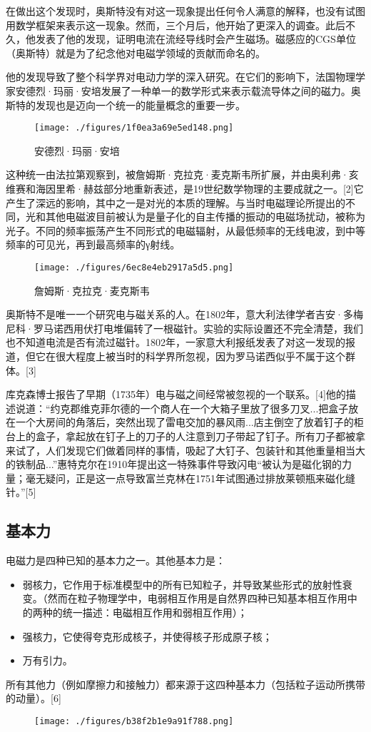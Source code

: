 在做出这个发现时，奥斯特没有对这一现象提出任何令人满意的解释，也没有试图用数学框架来表示这一现象。然而，三个月后，他开始了更深入的调查。此后不久，他发表了他的发现，证明电流在流经导线时会产生磁场。磁感应的CGS单位（奥斯特）就是为了纪念他对电磁学领域的贡献而命名的。

他的发现导致了整个科学界对电动力学的深入研究。在它们的影响下，法国物理学家安德烈·玛丽·安培发展了一种单一的数学形式来表示载流导体之间的磁力。奥斯特的发现也是迈向一个统一的能量概念的重要一步。
\begin{figure}[ht]
\centering
\texttt{[image: ./figures/1f0ea3a69e5ed148.png]}
\caption{安德烈·玛丽·安培} \label{fig_DCXHZY_2}
\end{figure}

这种统一由法拉第观察到，被詹姆斯·克拉克·麦克斯韦所扩展，并由奥利弗·亥维赛和海因里希·赫兹部分地重新表述，是19世纪数学物理的主要成就之一。[2]它产生了深远的影响，其中之一是对光的本质的理解。与当时电磁理论所提出的不同，光和其他电磁波目前被认为是量子化的自主传播的振动的电磁场扰动，被称为光子。不同的频率振荡产生不同形式的电磁辐射，从最低频率的无线电波，到中等频率的可见光，再到最高频率的γ射线。
\begin{figure}[ht]
\centering
\texttt{[image: ./figures/6ec8e4eb2917a5d5.png]}
\caption{詹姆斯·克拉克·麦克斯韦} \label{fig_DCXHZY_3}
\end{figure}
奥斯特不是唯一一个研究电与磁关系的人。在1802年，意大利法律学者吉安·多梅尼科·罗马诺西用伏打电堆偏转了一根磁针。实验的实际设置还不完全清楚，我们也不知道电流是否有流过磁针。1802年，一家意大利报纸发表了对这一发现的报道，但它在很大程度上被当时的科学界所忽视，因为罗马诺西似乎不属于这个群体。[3]

库克森博士报告了早期（1735年）电与磁之间经常被忽视的一个联系。[4]他的描述说道：“约克郡维克菲尔德的一个商人在一个大箱子里放了很多刀叉...把盒子放在一个大房间的角落后，突然出现了雷电交加的暴风雨...店主倒空了放着钉子的柜台上的盒子，拿起放在钉子上的刀子的人注意到刀子带起了钉子。所有刀子都被拿来试了，人们发现它们做着同样的事情，吸起了大钉子、包装针和其他重量相当大的铁制品...”惠特克尔在1910年提出这一特殊事件导致闪电“被认为是磁化钢的力量；毫无疑问，正是这一点导致富兰克林在1751年试图通过排放莱顿瓶来磁化缝针。”[5]
\subsection{基本力}
电磁力是四种已知的基本力之一。其他基本力是：
\begin{itemize}
\item 弱核力，它作用于标准模型中的所有已知粒子，并导致某些形式的放射性衰变。（然而在粒子物理学中，电弱相互作用是自然界四种已知基本相互作用中的两种的统一描述：电磁相互作用和弱相互作用）；
\item 强核力，它使得夸克形成核子，并使得核子形成原子核；
\item 万有引力。
\end{itemize}
所有其他力（例如摩擦力和接触力）都来源于这四种基本力（包括粒子运动所携带的动量）。[6]
\begin{figure}[ht]
\centering
\texttt{[image: ./figures/b38f2b1e9a91f788.png]}
\caption{} \label{fig_DCXHZY_4}
\end{figure}

